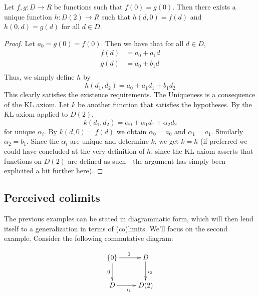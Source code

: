 \begin{proposition}
  Let \( f,g:D\to R \) be functions such that \( f(0)=g(0) \). Then there exists a unique function \( h:D(2)\to R \) such that \( h(d,0) = f(d) \) and \( h(0,d)=g(d) \) for all \( d\in D \).
  \label{prop:d2}
\end{proposition}

\begin{proof}
  Let \( a_0 = g(0)=f(0) \). Then we have that for all \( d\in D \),
  \begin{align*}
    f(d) &= a_0 + a_1d \\
    g(d) &= a_0 + b_1d \\
  \end{align*}
  Thus, we simply define \( h \) by
  \begin{equation*}
    h(d_1,d_2) = a_0 + a_1d_1 + b_1d_2
  \end{equation*}
  This clearly satisfies the existence requirements. The Uniqueness is a consequence of the KL axiom. Let \( k \) be another function that satisfies the hypotheses. By the KL axiom applied to \( D(2) \),
  \begin{equation*}
    k(d_1,d_2) = \alpha_0 + \alpha_1d_1 + \alpha_2d_2
  \end{equation*}
  for unique \( \alpha_i \). By \( k(d,0)=f(d) \) we obtain \( \alpha_0=a_0 \) and \( \alpha_1 = a_1 \). Similarly \( \alpha_2=b_1 \). Since the \( \alpha_i \) are unique and determine \( k \), we get \( k=h \) (if preferred we could have concluded at the very definition of \( h \), since the KL axiom asserts that functions on \( D(2) \) are defined as such - the argument has simply been explicited a bit further here).

\end{proof}

\subsection{Perceived colimits}

The previous examples can be stated in diagrammatic form, which will then lend itself to a generalization in terms of (co)limits. We'll focus on the second example. Consider the following commutative diagram:

\begin{equation}
  \xymatrix{
    {\{0\}} \ar[d]_0 \ar[r]^0   & D \ar[d]^{i_2} \\
    D \ar[r]_{i_1}              & D(2)
  }
  \label{dg:pushout}
\end{equation}


